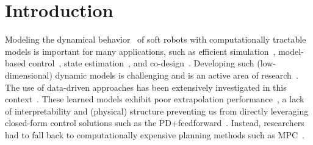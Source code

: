 \section{Introduction}
Modeling the dynamical behavior~\cite{armanini2023soft} of soft robots with computationally tractable models is important for many applications, such as efficient simulation~\cite{alkayas2025soft}, model-based control~\cite{della2023model}, state estimation~\cite{shao2023model}, and co-design~\cite{wang2024diffusebot}. 
%
% 
Developing such (low-dimensional) dynamic models is challenging and is an active area of research~\cite{alora2023data, armanini2023soft}. The use of data-driven approaches has been extensively investigated in this context~\cite{thuruthel2017learning, bruder2020data, alora2023data, chen2024data}.
These learned models exhibit poor extrapolation performance~\cite{kim2021review}, a lack of interpretability and (physical) structure preventing us from directly leveraging closed-form control solutions such as the PD+feedforward~\cite{della2023model}. Instead, researchers had to fall back to computationally expensive planning methods such as \gls{MPC}~\cite{bruder2020data, alora2023data}.

